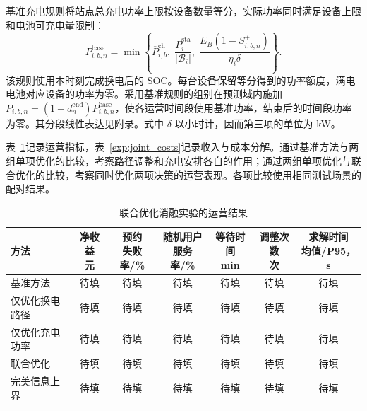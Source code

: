 基准充电规则将站点总充电功率上限按设备数量等分，实际功率同时满足设备上限和电池可充电量限制：
\begin{equation}
 P_{i,b,n}^{\mathrm{base}}=
 \min\left\{
 \overline P_{i,b}^{\mathrm{ch}},\;
 \frac{\overline P_i^{\mathrm{sta}}}{|\mathcal B_i|},\;
 \frac{E_B(1-S_{i,b,n}^{+})}{\eta_i\delta}
 \right\}.
 \label{eq:baseline_power}
\end{equation}
该规则使用本时刻完成换电后的 SOC。每台设备保留等分得到的功率额度，满电电池对应设备的功率为零。采用基准规则的组别在预测域内施加 $P_{i,b,n}=(1-d_n^{\mathrm{end}})P_{i,b,n}^{\mathrm{base}}$，使各运营时间段使用基准功率，结束后的时间段功率为零。其分段线性表达见附录。式中 $\delta$ 以小时计，因而第三项的单位为 kW。

表~\ref{exp:joint_results}记录运营指标，表~\ref{exp:joint_costs}记录收入与成本分解。通过基准方法与两组单项优化的比较，考察路径调整和充电安排各自的作用；通过两组单项优化与联合优化的比较，考察同时优化两项决策的运营表现。各项比较使用相同测试场景的配对结果。

\begin{table}[!htbp]
  \centering
  \caption{联合优化消融实验的运营结果}
  \label{exp:joint_results}
  \small
  \setlength{\tabcolsep}{3pt}
  \begin{tabularx}{\linewidth}{@{}Xcccccc@{}}
    \toprule
    方法 & \shortstack{净收益\\元} & \shortstack{预约\\失败率/\%} & \shortstack{随机用户\\服务率/\%} & \shortstack{等待时间\\min} & \shortstack{调整次数\\次} & \shortstack{求解时间\\均值/P95，s} \\
    \midrule
    基准方法 & 待填 & 待填 & 待填 & 待填 & 待填 & 待填 \\
    仅优化换电路径 & 待填 & 待填 & 待填 & 待填 & 待填 & 待填 \\
    仅优化充电功率 & 待填 & 待填 & 待填 & 待填 & 待填 & 待填 \\
    联合优化 & 待填 & 待填 & 待填 & 待填 & 待填 & 待填 \\
    完美信息上界 & 待填 & 待填 & 待填 & 待填 & 待填 & 待填 \\
    \bottomrule
  \end{tabularx}
\end{table}

